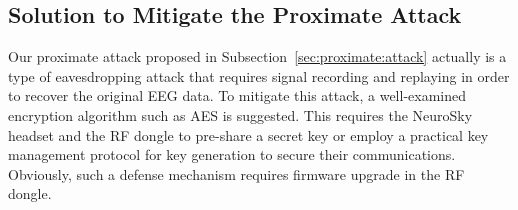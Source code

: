 
\subsection{Solution to Mitigate the Proximate Attack}

Our proximate attack proposed in Subsection~\ref{sec:proximate:attack} actually is a type of eavesdropping attack that requires signal recording and replaying in order to recover the original EEG data. To mitigate this attack, a well-examined encryption algorithm such as AES is suggested. This requires the NeuroSky headset and the RF dongle to pre-share a secret key or employ a practical key management protocol for key generation to secure their communications. Obviously, such a defense mechanism requires firmware upgrade in the RF dongle.


